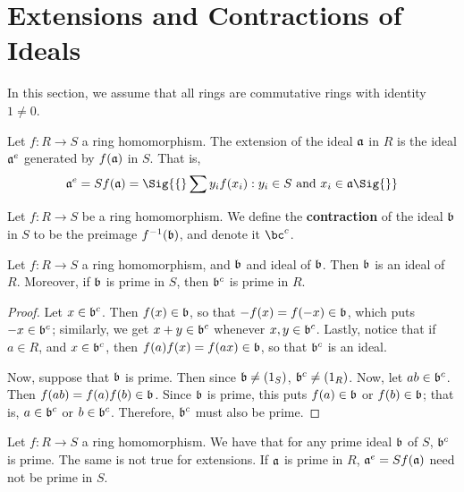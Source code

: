 \section{Extensions and Contractions of Ideals}
\label{section_5.6}

In this section, we assume that all rings are commutative rings with
identity $1 \neq 0$.

\begin{definition}
  Let $f:R \xrightarrow{} S$ a ring homomorphism. The extension of the ideal
  $\af$ in $R$ is the ideal $\af^e$ generated by $f(\af)$ in $S$. That is,
  \begin{equation*}
    \af^e=Sf(\af)=
    \Sig{\{} \sum{y_if(x_i) : y_i \in S \text{ and } x_i \in \af} \Sig{\}}
  \end{equation*}
\end{definition}

\begin{definition}
  Let $f:R \xrightarrow{} S$ be a ring homomorphism. We define the
  \textbf{contraction} of the ideal $\bf$ in $S$ to be the preimage
  $\inv{f}(\bf)$, and denote it $\bc^c$.
\end{definition}

\begin{proposition}\label{proposition_5.6.2}
    Let $f:R \xrightarrow{} S$ a ring homomorphism, and $\bf$ and ideal of
    $\bf$. Then $\bf$ is an ideal of $R$. Moreover, if $\bf$ is prime in $S$,
    then  $\bf^c$ is prime in $R$.
\end{proposition}
\begin{proof}
    Let $x \in \bf^c$. Then  $f(x) \in \bf$, so that $-f(x)=f(-x) \in
    \bf$, which puts $-x \in \bf^c$; similarly, we get $x+y \in \bf^c$ whenever
    $x,y \in \bf^c$. Lastly, notice that if  $a \in R$, and  $x \in \bf^c$, then
     $f(a)f(x)=f(ax) \in \bf$, so that $\bf^c$ is an ideal.

     Now, suppose that  $\bf$ is prime. Then since  $\bf \neq (1_S)$, $\bf^c
     \neq (1_R)$. Now, let $ab \in \bf^c$. Then  $f(ab)=f(a)f(b) \in
     \bf$. Since $\bf$ is prime, this puts  $f(a) \in \bf$ or $f(b) \in
     \bf$; that is, $a \in \bf^c$ or  $b \in \bf^c$. Therefore, $\bf^c$ must
     also be prime.
\end{proof}

\begin{example}\label{example_1.21}
    Let $f:R \xrightarrow{} S$ a ring homomorphism. We have that for any prime
    ideal $\bf$ of $S$, $\bf^c$ is prime. The same is not true for extensions.
    If $\af$ is prime in $R$,  $\af^e=Sf(\af)$ need not be prime in $S$.
\end{example}

